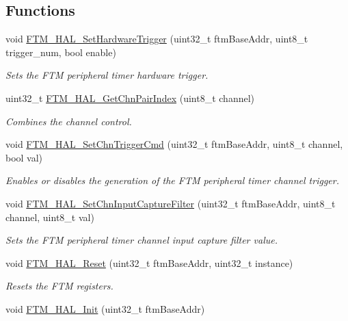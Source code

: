 \subsection*{Functions}
\begin{DoxyCompactItemize}
\item 
void \hyperlink{group__ftm__hal_ga821a0ba6562df6593adafb19d7211bf2}{F\+T\+M\+\_\+\+H\+A\+L\+\_\+\+Set\+Hardware\+Trigger} (uint32\+\_\+t ftm\+Base\+Addr, uint8\+\_\+t trigger\+\_\+num, bool enable)
\begin{DoxyCompactList}\small\item\em Sets the F\+TM peripheral timer hardware trigger. \end{DoxyCompactList}\item 
uint32\+\_\+t \hyperlink{group__ftm__hal_ga16b264b492e4eaa1c5de876eb8400529}{F\+T\+M\+\_\+\+H\+A\+L\+\_\+\+Get\+Chn\+Pair\+Index} (uint8\+\_\+t channel)
\begin{DoxyCompactList}\small\item\em Combines the channel control. \end{DoxyCompactList}\item 
void \hyperlink{group__ftm__hal_gad998b9480e2df94f108e51cf5448acc6}{F\+T\+M\+\_\+\+H\+A\+L\+\_\+\+Set\+Chn\+Trigger\+Cmd} (uint32\+\_\+t ftm\+Base\+Addr, uint8\+\_\+t channel, bool val)
\begin{DoxyCompactList}\small\item\em Enables or disables the generation of the F\+TM peripheral timer channel trigger. \end{DoxyCompactList}\item 
void \hyperlink{group__ftm__hal_ga8e20915f0866f000c672cb12e20c81e6}{F\+T\+M\+\_\+\+H\+A\+L\+\_\+\+Set\+Chn\+Input\+Capture\+Filter} (uint32\+\_\+t ftm\+Base\+Addr, uint8\+\_\+t channel, uint8\+\_\+t val)
\begin{DoxyCompactList}\small\item\em Sets the F\+TM peripheral timer channel input capture filter value. \end{DoxyCompactList}\item 
void \hyperlink{group__ftm__hal_ga56f497e6231ee52889eb269f5216c132}{F\+T\+M\+\_\+\+H\+A\+L\+\_\+\+Reset} (uint32\+\_\+t ftm\+Base\+Addr, uint32\+\_\+t instance)
\begin{DoxyCompactList}\small\item\em Resets the F\+TM registers. \end{DoxyCompactList}\item 
void \hyperlink{group__ftm__hal_gacf419efabc3d6d06cb50938bdad7de5c}{F\+T\+M\+\_\+\+H\+A\+L\+\_\+\+Init} (uint32\+\_\+t ftm\+Base\+Addr)

\end{DoxyCompactItemize}
